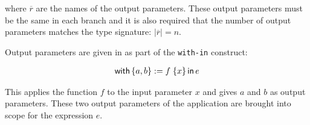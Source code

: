 \noindent
where $\overline{r}$ are the names of the output parameters. These output parameters
must be the same in each branch and it is also required that the number of output parameters matches the type signature: $|\overline{r}| = n$.

Output parameters are given in \PikaCore{} as part of the \verb|with-in| construct:

\begin{align*}
  \textsf{with}\,\{ a, b \} := f\; \{ x \}\,\textsf{in}\, e
\end{align*}

This applies the function $f$ to the input parameter $x$ and gives $a$ and $b$ as output parameters. These two
output parameters of the application are brought into scope for the \PikaCore{} expression $e$.

